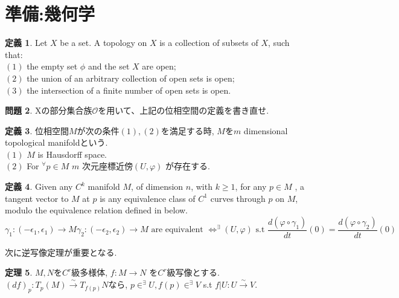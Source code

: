 \documentclass{jsarticle}
\theoremstyle{definition}
\newtheorem{theorem}{定理}
\newtheorem{definition}[theorem]{定義}
\newtheorem{problem}[theorem]{問題}
\begin{document}
\section{準備:幾何学}
\begin{definition}
Let $X$  be a set. A topology on $X$ is a collection of subsets of $X$, such that:\\
$(1)$ the empty set $\phi$ and the set $X$ are open;\\
$(2)$ the union of an arbitrary collection of open sets is open;\\
$(3)$ the intersection of a finite number of open sets is open.
\end{definition}
\begin{problem}
Xの部分集合族$\mathcal{O}$を用いて、上記の位相空間の定義を書き直せ.
\end{problem}
\begin{definition}
位相空間$M$が次の条件$(1), (2)$を満足する時, $M$を$m$ dimensional topological manifoldという.\\
$(1)$ $M$ is Hausdorff space.\\
$(2)$ For $^{\forall} p\in M$  $m$ 次元座標近傍$(U, \varphi)$ が存在する.
\end{definition}
\begin{definition}
Given any $C^k$ manifold $M$, of dimension $n$, with $k \geq 1$, for any $p\in M$ , a tangent vector to $M$ at $p$ is any equivalence class of $C^1$ curves through $p$ on $M$, modulo the equivalence relation defined in below.
\begin{equation}
\gamma_1:(-\epsilon _1, \epsilon_1 ) \rightarrow M  \gamma_2:(-\epsilon _2, \epsilon_2 ) \rightarrow M \text{ are equivalent } \Leftrightarrow ^\exists (U, \varphi ) \text{  s.t } \frac{d(\varphi \circ \gamma_1)}{dt} (0)=\frac{d(\varphi \circ \gamma_2)}{dt} (0)
\end{equation}
\end{definition}
次に逆写像定理が重要となる.
\begin{theorem}
$M,N$を$C^r$級多様体, $f:M\rightarrow N$ を$C^r$級写像とする.
$(df)_p:T_p(M)\overset{\sim}{\longrightarrow }T_{f(p)}N $なら, $p \in ^\exists U, f(p) \in ^\exists V $ s.t $f|U:U\overset{\sim}{\longrightarrow}V.$
\end{theorem}
\end{document}

